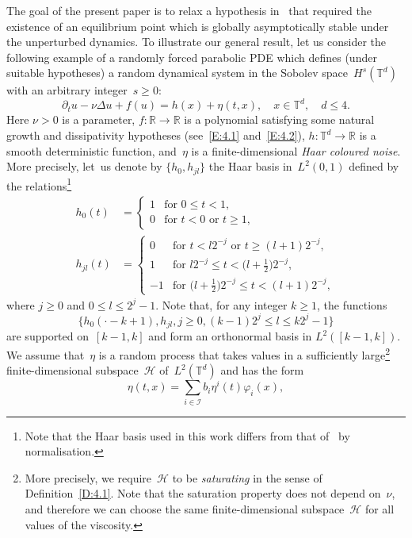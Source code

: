 \documentclass[JEP,XML,SOM,Unicode,ThmDefs]{cedram}
\let\mathcal\mathscr
\theoremstyle{plain}
\numberwithin{equation}{section}
\let\p\partial
\newcommand{\R}{{\mathbb R}}
\newcommand{\T}{{\mathbb T}}
\newcommand{\HH}{{\mathcal H}}
\newcommand{\II}{{\mathcal I}}
\begin{document}
The goal of the present paper is to relax a hypothesis in~\cite{KNS-2020} that required the existence of an equilibrium point which is globally asymptotically stable under the unperturbed dynamics. To illustrate our general result, let us consider the following example of a randomly forced parabolic PDE which defines (under suitable hypotheses) a random dynamical system in the Sobolev space~$H^s(\T^d)$ with an arbitrary integer~$s\ge0$:
\begin{equation} \label{rf-pde}
\p_t u-\nu\Delta u+f(u)=h(x)+\eta(t,x), \quad x\in\T^d, \quad d\le 4.
\end{equation}
Here $\nu>0$ is a parameter, $f:\R\to\R$ is a polynomial satisfying some natural growth and dissipativity hypotheses (see~\eqref{E:4.1} and~\eqref{E:4.2}), $h: \T^d\to \R$ is a smooth deterministic function, and~$\eta$ is a finite-dimensional \emph{Haar coloured noise}. More precisely, let~us denote by $\{h_0,h_{jl}\}$ the Haar basis in~$L^2(0,1)$ defined by the relations\footnote{Note that the Haar basis used in this work differs from that of~\cite[\S 22]{lamperti1996} by normalisation.}
\begin{align*}
h_0(t)&=
\begin{cases}
1 & \text{for $0\le t<1$},\\
0 & \text{for $t<0$ or $t\ge1$},
\end{cases}
\\
h_{jl}(t)&=
\begin{cases}
0 & \text{for $t<l2^{-j}$ or $t\ge (l+1)2^{-j}$},\\
1 & \text{for $l2^{-j}\le t<\bigl(l+\tfrac12\bigr)2^{-j}$},\\
-1 & \text{for $\bigl(l+\tfrac12\bigr)2^{-j}\le t<(l+1)2^{-j}$},
\end{cases}
\end{align*}
where $j\ge0$ and $0\le l\le 2^j-1$. Note that, for any integer $k\ge1$, the functions
\[
\bigl\{h_0(\cdot-k+1),h_{jl}, j\ge0,(k-1)2^j\le l\le k2^j-1\bigr\}
\]
are supported on~$[k-1,k]$ and form an orthonormal basis in $L^2([k-1,k])$. We assume that~$\eta$ is a random process that takes values in a sufficiently large\footnote{More precisely, we require~$\HH$ to be \emph{saturating} in the sense of Definition~\ref{D:4.1}. Note that the saturation property does not depend on~$\nu$, and therefore we can choose the same finite-dimensional subspace~$\HH$ for all values of the viscosity.} finite-dimensional subspace~$\HH$ of~$L^2(\T^d)$ and has the form
\begin{equation} \label{eta-intro}
\eta(t,x)= \sum_{i\in\II}b_i \eta^i(t)\varphi_i(x),
\end{equation}
\end{document}

